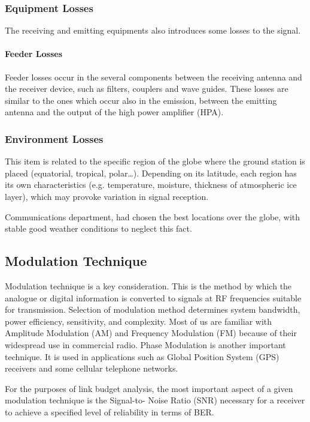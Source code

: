 \subsubsection{Equipment Losses}
The receiving and emitting equipments also introduces some losses to the signal.\\

\paragraph{Feeder Losses} Feeder losses occur in the several components between the receiving antenna and the receiver device, such as filters, couplers and wave guides. These losses are similar to the ones which occur also in the emission, between the emitting antenna and the output of the high power amplifier (HPA).\cite{Jorge2012}

\subsubsection{Environment Losses}
This item is related to the specific region of the globe where the ground station is placed (equatorial, tropical, polar…). Depending on its latitude, each region has its own characteristics (e.g. temperature, moisture, thickness of atmospheric ice layer), which may provoke variation in signal reception. \cite{Jorge2012}

Communications department, had chosen the best locations over the globe, with stable good weather conditions to neglect this fact.

\subsection{Modulation Technique}
Modulation technique is a key consideration. This is the method by which the analogue or digital information is converted to signals at RF frequencies suitable for transmission. Selection of modulation method determines system bandwidth, power efficiency, sensitivity, and complexity. Most of us are familiar with Amplitude Modulation (AM) and Frequency Modulation (FM) because of their widespread use in commercial radio. Phase Modulation is another important technique. It is used in applications such as Global Position System (GPS) receivers and some cellular telephone networks. \cite{Note1998}

For the purposes of link budget analysis, the most important aspect of a given modulation technique is the Signal-to- Noise Ratio (SNR) necessary for a receiver to achieve a specified level of reliability in terms of BER.

